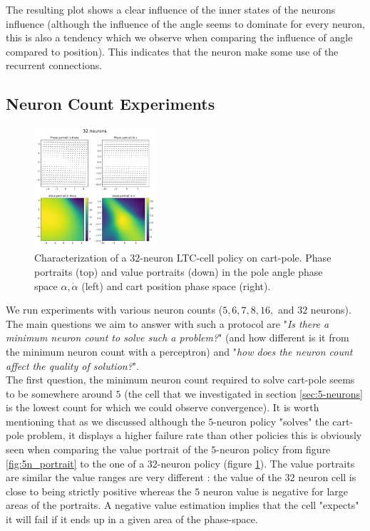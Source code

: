 The resulting plot shows a clear influence of the inner states of the neurons influence (although the influence of the angle seems to dominate for every neuron, this is also a tendency which we observe when comparing the influence of angle compared to position). This indicates that the neuron make some use of the recurrent connections. 


\subsection{Neuron Count Experiments}
\begin{figure}[h!]
    \centering
    \includegraphics[width=0.4\textwidth]{figures/32_n_portrait.pdf}
    \caption{Characterization of a 32-neuron LTC-cell policy on cart-pole. Phase portraits (top) and value portraits (down) in the pole angle phase space $\alpha,\dot{\alpha}$ (left) and cart position phase space (right).}
    \label{fig:32n_portrait}
\end{figure}

We run experiments with various neuron counts ($5,6,7,8,16,$ and $32$ neurons). The main questions we aim to answer with such a protocol are "\textit{Is there a minimum neuron count to solve such a problem?}" (and how different is it from the minimum neuron count with a perceptron) and "\textit{how does the neuron count affect the quality of solution?}". \\

The first question, the minimum neuron count required to solve cart-pole seems to be somewhere around $5$ (the cell that we investigated in section \ref{sec:5-neurons} is the lowest count for which we could observe convergence). It is worth mentioning that as we discussed although the $5$-neuron policy "solves" the cart-pole problem, it displays a higher failure rate than other policies this is obviously seen when comparing the value portrait of the $5$-neuron policy from figure \ref{fig:5n_portrait} to the one of a $32$-neuron policy (figure \ref{fig:32n_portrait}). The value portraits are similar the value ranges are very different : the value of the $32$ neuron cell is close to being strictly positive whereas the $5$ neuron value is negative for large areas of the portraits. A negative value estimation implies that the cell "expects" it will fail if it ends up in a given area of the phase-space. \\

